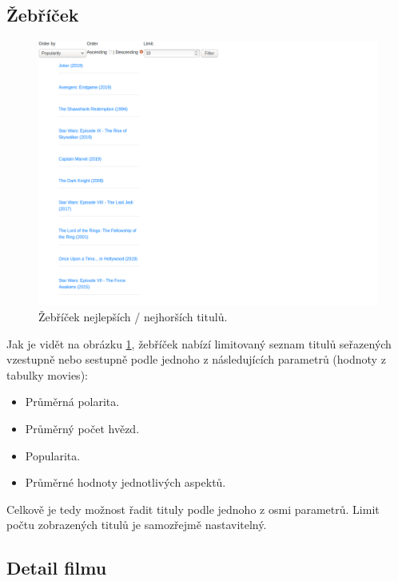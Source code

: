 \subsection{Žebříček}
\FloatBarrier
\begin{figure}[!htb]
\label{leaderb}
\centering
\includegraphics[width=\textwidth]{leaderboard.png}
\caption{Žebříček nejlepších / nejhorších titulů.}
\end{figure}
\FloatBarrier
Jak je vidět na obrázku \ref{leaderb}, žebříček nabízí limitovaný seznam titulů seřazených vzestupně nebo sestupně podle jednoho z následujících parametrů (hodnoty z tabulky movies):
\begin{itemize}
  \item Průměrná polarita.
  \item Průměrný počet hvězd.
  \item Popularita.
  \item Průměrné hodnoty jednotlivých aspektů. 
\end{itemize}
Celkově je tedy možnost řadit tituly podle jednoho z osmi parametrů. Limit počtu zobrazených titulů je samozřejmě nastavitelný. 

\pagebreak
\subsection{Detail filmu}
\label{moviedetail}
\FloatBarrier

